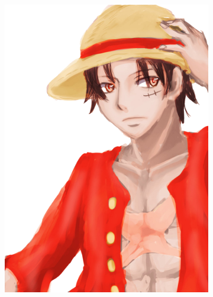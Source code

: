 \begin{figure}[htb!]
\begin{subfigure}{0.24\textwidth}
\includegraphics[width=\textwidth]{images/rufy_original2.png}
\end{subfigure}
\begin{subfigure}{0.24\textwidth}

\end{subfigure}
\end{figure}
